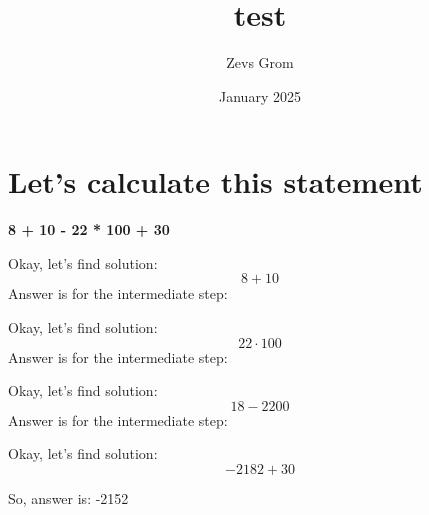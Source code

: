 \documentclass{article}
\title{test}
\author{Zevs Grom}
\date{January 2025}
\begin{document}
\maketitle
\section{Let's calculate this statement} \textbf{\Large 8 + 10 - 22 * 100 + 30\normalsize}

Okay, let's find solution:\begin{equation}
 8 + 10
 \end{equation}
Answer is for the intermediate step:  

Okay, let's find solution:\begin{equation}
 22 \cdot 100
 \end{equation}
Answer is for the intermediate step:  

Okay, let's find solution:\begin{equation}
 18 - 2200
 \end{equation}
Answer is for the intermediate step:  \texbf{\large-2182\normalsize}

Okay, let's find solution:\begin{equation}
 -2182 + 30
 \end{equation}

So, answer is:  -2152
\end{document}

